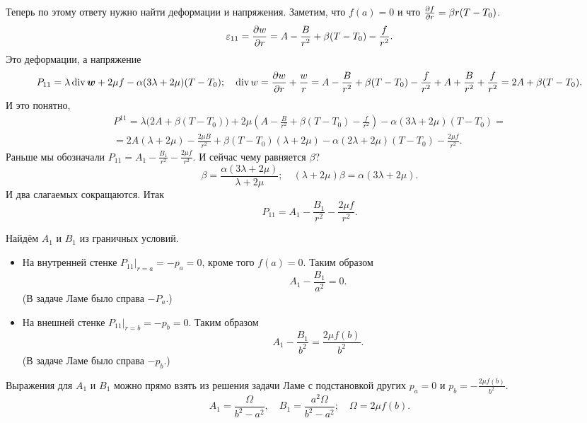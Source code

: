 Теперь по этому ответу нужно найти деформации и напряжения. Заметим, что $f(a)=0$ и что $\frac{\partial f}{\partial r} = \beta r (T-T_0)$.
\[
  \varepsilon_{11} = \frac{\partial w}{\partial r} = A - \frac B{r^2} + \beta(T-T_0) - \frac f{r^2}.
\]
Это деформации, а напряжение
\[
  P_{11} = \lambda \operatorname{div} \boldsymbol{w} + 2\mu f - \alpha(3\lambda+2\mu) (T-T_0);\quad
  \operatorname{div} w = \frac{\partial w}{\partial r} + \frac wr = A - \frac B{r^2} + \beta(T-T_0) - \frac{f}{r^2} + A + \frac{B}{r^2} + \frac{f}{r^2} = 2A + \beta(T-T_0).
\]
И это понятно,
\begin{multline*}
  P^{11} = \lambda \big(2A + \beta(T-T_0)\big) + 2\mu\left( A - \frac B{r^2} +\beta(T-T_0) - \frac f{r^2} \right) - \alpha(3\lambda + 2\mu)(T-T_0) = \\=
  2A(\lambda+2\mu) - \frac{2\mu B}{r^2} + \beta(T-T_0)(\lambda+2\mu) - \alpha(2\lambda+2\mu)(T-T_0) - \frac{2\mu f}{r^2}.
\end{multline*}
Раньше мы обозначали $P_{11} = A_1 -\frac{B_1}{r^2} - \frac {2\mu f}{r^2}$. И сейчас чему равняется $\beta$?
\[
  \beta = \frac{\alpha(3\lambda+2\mu)}{\lambda+2\mu};\quad
  (\lambda+2\mu)\beta= \alpha(3\lambda+2\mu).
\]
И два слагаемых сокращаются. Итак
\[
  P_{11} = A_1 - \frac{B_1}{r^2} - \frac{2\mu f}{r^2}.
\]

Найдём $A_1$ и $B_1$ из граничных условий.
\begin{itemize}
\item На внутренней стенке $P_{11}|_{r=a} = -p_a=0$, кроме того $f(a)=0$. Таким образом
\[ 
  A_1 - \frac{B_1}{a^2} = 0.
\]
(В задаче Ламе было справа $-P_a$.)
\item На внешней стенке $P_{11}|_{r=b} = -p_b=0$. Таким образом
\[
  A_1 - \frac{B_1}{b^2} = \frac{2\mu f(b)}{b^2}.
\]
(В задаче Ламе было справа $-p_b$.)
\end{itemize}
Выражения для $A_1$ и $B_1$ можно прямо взять из решения задачи Ламе с подстановкой других $p_a=0$ и $p_b = -\frac{2\mu f(b)}{b^2}$.
\[
  A_1 = \frac{\Omega}{b^2-a^2},\quad
  B_1 = \frac{a^2\Omega}{b^2-a^2};\quad
  \Omega = 2\mu f(b).
\]
